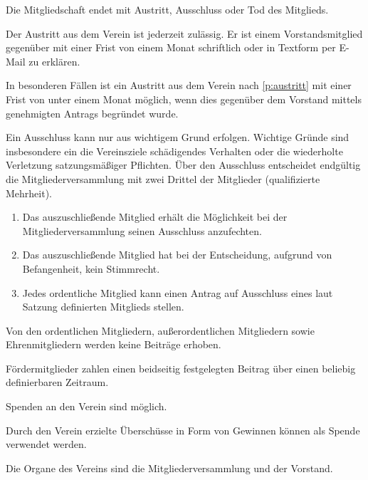 \documentclass[%
    parskip=half,
]{scrartcl}
\begin{document}
\begin{contract}
		
		Die Mitgliedschaft endet mit Austritt, Ausschluss oder Tod des Mitglieds.
		
		Der Austritt aus dem Verein ist jederzeit zulässig. Er ist einem Vorstandsmitglied gegenüber mit einer Frist von einem Monat schriftlich oder in Textform per E-Mail zu erklären.
		\label{p:austritt}
		
		In besonderen Fällen ist ein Austritt aus dem Verein nach \ref{p:austritt} mit einer Frist von unter einem Monat möglich, wenn dies gegenüber dem Vorstand mittels genehmigten Antrags begründet wurde.
		
		Ein Ausschluss kann nur aus wichtigem Grund erfolgen. Wichtige Gründe sind insbesondere ein die Vereinsziele schädigendes Verhalten oder die wiederholte Verletzung satzungsmäßiger Pflichten. Über den Ausschluss entscheidet endgültig die Mitgliederversammlung mit zwei Drittel der Mitglieder (qualifizierte Mehrheit).
		
		\begin{enumerate}[\qquad a)]
			\item Das auszuschließende Mitglied erhält die Möglichkeit bei der Mitgliederversammlung seinen Ausschluss anzufechten.
			\item Das auszuschließende Mitglied hat bei der Entscheidung, aufgrund von Befangenheit, kein Stimmrecht.
			\item Jedes ordentliche Mitglied kann einen Antrag auf Ausschluss eines laut Satzung definierten Mitglieds stellen.
		\end{enumerate}
		
		
		Von den ordentlichen Mitgliedern, außerordentlichen Mitgliedern sowie Ehrenmitgliedern werden keine Beiträge erhoben.
		
		Fördermitglieder zahlen einen beidseitig festgelegten Beitrag über einen beliebig definierbaren Zeitraum.
		
		
		Spenden an den Verein sind möglich.
		
		Durch den Verein erzielte Überschüsse in Form von Gewinnen können als Spende verwendet werden.
		
		
		Die Organe des Vereins sind die Mitgliederversammlung und der Vorstand.
		
		

\end{contract}
\end{document}

